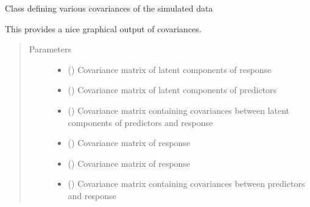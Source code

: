 \documentclass[letterpaper,10pt,english]{sphinxmanual}
\begin{document}
\begin{fulllineitems}
\label{\detokenize{Classes:pysimrel.Covariances}}
Class defining various covariances of the simulated data

This provides a nice graphical output of covariances.
\begin{quote}\begin{description}
\item[{Parameters}] \leavevmode\begin{itemize}
\item {} 
 () \textendash{} Covariance matrix of latent components of response

\item {} 
 () \textendash{} Covariance matrix of latent components of predictors

\item {} 
 () \textendash{} Covariance matrix containing covariances between latent components of predictors and response

\item {} 
 () \textendash{} Covariance matrix of response

\item {} 
 () \textendash{} Covariance matrix of response

\item {} 
 () \textendash{} Covariance matrix containing covariances between predictors and response

\end{itemize}

\end{description}\end{quote}

\end{fulllineitems}

\end{document}
